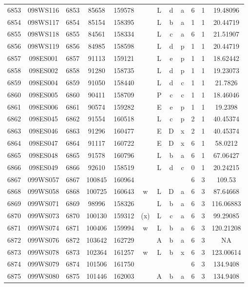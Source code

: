 \begin{tabular}{|*{12}{c|}}
6853 & 098WS116 & 6853 & 85658 & 159578 &  & L & d & a & 6 & 1 & 19.48096 \\ 
6854 & 098WS117 & 6854 & 85154 & 158395 &  & L & b & a & 1 & 1 & 20.44719 \\ 
6855 & 098WS118 & 6855 & 84561 & 158334 &  & L & c & a & 6 & 1 & 21.51907 \\ 
6856 & 098WS119 & 6856 & 84985 & 158598 &  & L & d & p & 1 & 1 & 20.44719 \\ 
6857 & 098ES001 & 6857 & 91113 & 159121 &  & L & e & p & 1 & 1 & 18.62442 \\ 
6858 & 098ES002 & 6858 & 91280 & 158735 &  & L & d & p & 1 & 1 & 19.23073 \\ 
6859 & 098ES004 & 6859 & 91050 & 158440 &  & L & d & c & 1 & 1 & 21.7826 \\ 
6860 & 098ES005 & 6860 & 90411 & 158709 &  & P & c & c & 1 & 1 & 18.46046 \\ 
6861 & 098ES006 & 6861 & 90574 & 159282 &  & E & e & p & 1 & 1 & 19.2398 \\ 
6862 & 098ES045 & 6862 & 91554 & 160518 &  & L & c & p & 2 & 1 & 40.45374 \\ 
6863 & 098ES046 & 6863 & 91296 & 160477 &  & E & D & x & 2 & 1 & 40.45374 \\ 
6864 & 098ES047 & 6864 & 91117 & 160722 &  & E & D & x & 6 & 1 & 58.0212 \\ 
6865 & 098ES048 & 6865 & 91578 & 160796 &  & L & b & a & 6 & 1 & 67.06427 \\ 
6866 & 098ES049 & 6866 & 92610 & 158519 &  & L & d & c & 0 & 1 & 20.24215 \\ 
6867 & 099WS057 & 6867 & 100845 & 160964 &  &  &  &  & 6 & 3 & 109.53 \\ 
6868 & 099WS058 & 6868 & 100725 & 160643 & w & L & D & a & 6 & 3 & 87.64668 \\ 
6869 & 099WS071 & 6869 & 98996 & 158326 &  & L & b & a & 6 & 3 & 116.06883 \\ 
6870 & 099WS073 & 6870 & 100130 & 159312 & (x) & L & c & a & 6 & 3 & 99.29085 \\ 
6871 & 099WS074 & 6871 & 100406 & 159994 & w & L & b & a & 6 & 3 & 120.21208 \\ 
6872 & 099WS076 & 6872 & 103642 & 162729 &  & A & b & a & 6 & 3 & NA \\ 
6873 & 099WS078 & 6873 & 102364 & 161257 & w & L & b & x & 6 & 3 & 123.00614 \\ 
6874 & 099WS079 & 6874 & 101506 & 161750 &  &  &  &  & 6 & 3 & 134.9408 \\ 
6875 & 099WS080 & 6875 & 101446 & 162003 &  & A & b & a & 6 & 3 & 134.9408 \\ 

\end{tabular}
